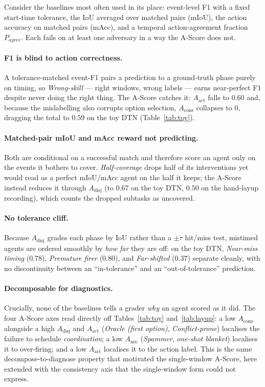 \documentclass[11pt]{article}
\newcommand{\Adisj}{A_{\text{disj}}}
\newcommand{\Aact}{A_{\text{act}}}
\newcommand{\Acons}{A_{\text{cons}}}
\newcommand{\Anec}{A_{\text{nec}}}
\begin{document}
Consider the baselines most often used in its place: event-level F1
with a fixed start-time tolerance, the IoU averaged over matched pairs
(mIoU), the action accuracy on matched pairs (mAcc), and a temporal
action-agreement fraction $P_{agree}$. Each fails on at least one
adversary in a way the A-Score does not.

\paragraph{F1 is blind to action correctness.}
A tolerance-matched event-F1 pairs a prediction to a ground-truth
phase purely on timing, so \emph{Wrong-skill} --- right windows, wrong
labels --- earns near-perfect F1 despite never doing the right thing.
The A-Score catches it: $\Aact$ falls to $0.60$ and, because the
mislabelling also corrupts option selection, $\Acons$ collapses to
$0$, dragging the total to $0.59$ on the toy DTN
(Table~\ref{tab:toy}).

\paragraph{Matched-pair mIoU and mAcc reward not predicting.}
Both are conditional on a successful match and therefore score an
agent only on the events it bothers to cover. \emph{Half-coverage}
drops half of its interventions yet would read as a perfect
mIoU/mAcc agent on the half it keeps; the A-Score instead reduces it
through $\Adisj$ (to $0.67$ on the toy DTN, $0.50$ on the hand-layup
recording), which counts the dropped subtasks as uncovered.

\paragraph{No tolerance cliff.}
Because $\Adisj$ grades each phase by IoU rather than a $\pm\tau$
hit/miss test, mistimed agents are ordered smoothly by \emph{how far}
they are off: on the toy DTN, \emph{Near-miss timing} ($0.78$),
\emph{Premature firer} ($0.80$), and \emph{Far-shifted} ($0.37$)
separate cleanly, with no discontinuity between an ``in-tolerance''
and an ``out-of-tolerance'' prediction.

\paragraph{Decomposable for diagnostics.}
Crucially, none of the baselines tells a grader \emph{why} an agent
scored as it did. The four A-Score axes read directly off
Tables~\ref{tab:toy} and~\ref{tab:layup}: a low $\Acons$ alongside a
high $\Adisj$ and $\Aact$ (\emph{Oracle (first option)},
\emph{Conflict-prone}) localises the failure to schedule
\emph{coordination}; a low $\Anec$ (\emph{Spammer}, \emph{one-shot
blanket}) localises it to over-firing; and a low $\Aact$ localises it
to the action label. This is the same decompose-to-diagnose property
that motivated the single-window A-Score, here extended with the
consistency axis that the single-window form could not express.
\end{document}
